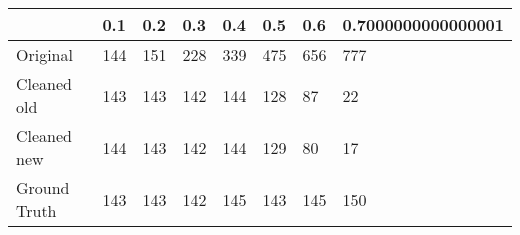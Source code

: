 \begin{tabular}{llllllll}
\toprule
{} &  0.1 &  0.2 &  0.3 &  0.4 &  0.5 &  0.6 & 0.7000000000000001 \\
\midrule
Original     &  144 &  151 &  228 &  339 &  475 &  656 &                777 \\
Cleaned old  &  143 &  143 &  142 &  144 &  128 &   87 &                 22 \\
Cleaned new  &  144 &  143 &  142 &  144 &  129 &   80 &                 17 \\
Ground Truth &  143 &  143 &  142 &  145 &  143 &  145 &                150 \\
\bottomrule
\end{tabular}
